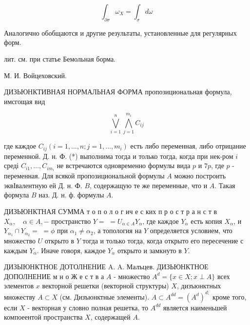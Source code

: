 \documentclass[10pt]{article}
\begin{document}
\[

\int_{\partial \sigma} \omega_{X}=\int_{\sigma} d \omega

\]



Аналогично обобщаются и другие результаты, установленные для регулярных форм.



лит. см. при статье Бемольная борма.



М. И. Войцеховский.



ДИЗЬЮНКТИВНАЯ НОРМАЛЬНАЯ ФОРМА пропозициональная формула, имсгощая вид



\[

\bigvee_{i=1}^{n} \bigwedge_{j=1}^{m_{i}} C_{i j}

\]



где каждое $C_{i j}\left(i=1, \ldots, n ; j=1, \ldots, m_{i}\right)$ есть либо переменная, либо отрицание переменной. Д. н. Ф. (*) выполнима тогда и только тогда, когда при нек-ром $i$ среді $C_{i 1}, \ldots, C_{i m_{i}}$ не встречаются одновременно формулы вида $p$ и $7 p$, где $p$ - переменная. Для всякой пропозициональной формулы $A$ можно построить эквІвалентную ей Д. н. Ф. $B$, содержащую те же переменные, что и $A$. Такая формула $B$ наз. Д. н. ф. формулы $A$.



ДИЗЬЮНКТНАЯ СУММА т о п о л о г ич е с ких п р о с т р а н с т в $X_{\alpha}, \quad \alpha \in A,-$ пространство $Y=$ $=U_{\alpha \in A} Y_{\alpha}$, где каждое $Y_{\alpha}$ есть копия $X_{\alpha}$, и $Y_{\alpha_{1}} \cap Y_{\alpha_{2}}=$ $=\phi$ при $\alpha_{1} \neq \alpha_{2}$, а топология на $Y$ определяется условием, что множество $U$ открыто в $Y$ тогда и только тогда, когда открыто его пересечение с каждым $Y_{\alpha}$. Иначе говоря, каждое $Y_{\alpha}$ открыто и замкнуто в $Y$.



ДИЗЫЮНКТНОЕ ДОТОЛНЕНИЕ A. A. Малъцев. ДИЗЬЮНКТНОЕ ДОПОЛНЕНИЕ м н о Ж е с т в а $A$ - множество $A^{d}=\{x \in X ; x \perp A\}$ всех элементов $x$ векторной решетки (векторной структуры) $X$, дизъюнктных множеству $A \subset X$ (см. Дизъюнктные элементы). $A \subset A^{d d}=\left(A^{d}\right)^{d ;}$ кроме того, если $X$ - векторная $у$ словно полная решетка, то $A^{d d}$ является наименьшей компоеентой пространства $X$, содержащей $A$.
\end{document}
